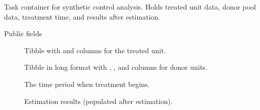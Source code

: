 \documentclass[a4paper]{book}
\begin{document}
%
\begin{Description}
Task container for synthetic control analysis. Holds treated unit data,
donor pool data, treatment time, and results after estimation.
\end{Description}
%
\begin{Section}{Public fields}

\begin{description}

\item[] Tibble with  and  columns
for the treated unit.

\item[] Tibble in long format with , ,
and  columns for donor units.

\item[] The time period when treatment begins.

\item[] Estimation results (populated after estimation).

\end{description}


\end{Section}
%
\end{document}
